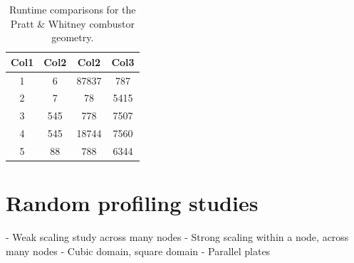 \begin{table}[h!]
\centering
\begin{tabular}{||c c c c||} 
 \hline
 Col1 & Col2 & Col2 & Col3 \\ [0.5ex] 
 \hline\hline
 1 & 6 & 87837 & 787 \\ 
 2 & 7 & 78 & 5415 \\
 3 & 545 & 778 & 7507 \\
 4 & 545 & 18744 & 7560 \\
 5 & 88 & 788 & 6344 \\ [1ex] 
 \hline
\end{tabular}
\caption{Runtime comparisons for the Pratt & Whitney combustor geometry.}
\label{table:PW_runtime_table}
\end{table}


\section{Random profiling studies}
- Weak scaling study across many nodes
- Strong scaling within a node, across many nodes
    - Cubic domain, square domain
    - Parallel plates
    
